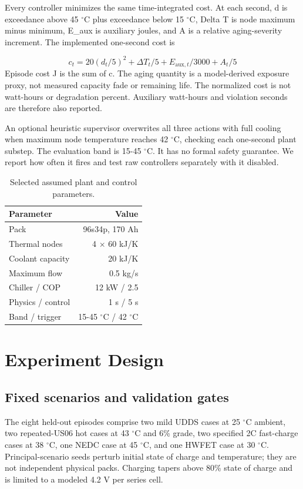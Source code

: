\documentclass[conference]{IEEEtran}
\begin{document}
Every controller minimizes the same time-integrated cost. At each second, d is exceedance above 45 $^{\circ}$C plus exceedance below 15 $^{\circ}$C, Delta T is node maximum minus minimum, E\_aux is auxiliary joules, and A is a relative aging-severity increment. The implemented one-second cost is

\begin{equation}
c_t=20(d_t/5)^2+\Delta T_t/5+E_{\mathrm{aux},t}/3000+A_t/5
\label{eq:3}
\end{equation}
Episode cost J is the sum of c. The aging quantity is a model-derived exposure proxy, not measured capacity fade or remaining life. The normalized cost is not watt-hours or degradation percent. Auxiliary watt-hours and violation seconds are therefore also reported.

An optional heuristic supervisor overwrites all three actions with full cooling when maximum node temperature reaches 42 $^{\circ}$C, checking each one-second plant substep. The evaluation band is 15-45 $^{\circ}$C. It has no formal safety guarantee. We report how often it fires and test raw controllers separately with it disabled.

\begin{table}[t]
\caption{Selected assumed plant and control parameters.}
\label{tab:I}
\centering\footnotesize
\begin{tabular}{lr}
\toprule
Parameter & Value\\
\midrule
Pack & 96s34p, 170 Ah\\
Thermal nodes & 4 $\times$ 60 kJ/K\\
Coolant capacity & 20 kJ/K\\
Maximum flow & 0.5 kg/s\\
Chiller / COP & 12 kW / 2.5\\
Physics / control & 1 s / 5 s\\
Band / trigger & 15-45 $^{\circ}$C / 42 $^{\circ}$C\\
\bottomrule
\end{tabular}
\end{table}
\section{Experiment Design}
\subsection{Fixed scenarios and validation gates}
The eight held-out episodes comprise two mild UDDS cases at 25 $^{\circ}$C ambient, two repeated-US06 hot cases at 43 $^{\circ}$C and 6\% grade, two specified 2C fast-charge cases at 38 $^{\circ}$C, one NEDC case at 45 $^{\circ}$C, and one HWFET case at 30 $^{\circ}$C. Principal-scenario seeds perturb initial state of charge and temperature; they are not independent physical packs. Charging tapers above 80\% state of charge and is limited to a modeled 4.2 V per series cell.
\end{document}
